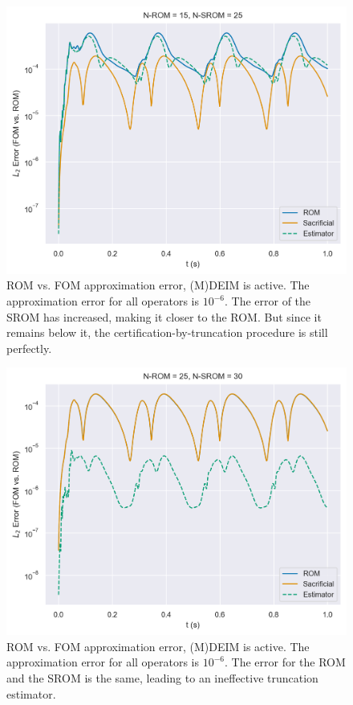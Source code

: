 \documentclass[../../thesis.tex]{subfiles}
\begin{document}
\newpage
\begin{figure}[h]
    \includegraphics[width =\columnwidth]{research_project/piston/figures/nonlinear_displacement/truncation_error/deim/error_estimation_rom_15_srom_25_0.png}
    \caption{ROM vs. FOM approximation error, (M)DEIM is active.
    The approximation error for all operators is $10^{-6}$.
    The error of the SROM has increased, making it closer to the ROM.
    But since it remains below it, 
    the certification-by-truncation procedure is still perfectly.}
    \label{fig:nlinear_disp_deim_errors_above_threshold}
\end{figure}

\begin{figure}[h]
    \includegraphics[width =\columnwidth]{research_project/piston/figures/nonlinear_displacement/truncation_error/deim/error_estimation_rom_25_srom_30_0.png}
    \caption{ROM vs. FOM approximation error, (M)DEIM is active.
    The approximation error for all operators is $10^{-6}$.
    The error for the ROM and the SROM is the same, leading to an ineffective truncation estimator.}
    \label{fig:nlinear_disp_deim_errors_below_threshold}
\end{figure}
\end{document}
